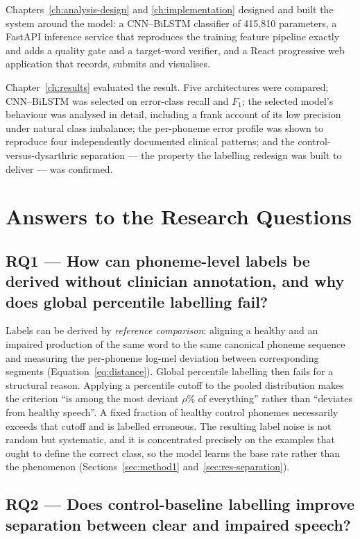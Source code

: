 Chapters~\ref{ch:analysis-design} and \ref{ch:implementation} designed and built
the system around the model: a CNN--BiLSTM classifier of 415{,}810 parameters, a
FastAPI inference service that reproduces the training feature pipeline exactly
and adds a quality gate and a target-word verifier, and a React progressive web
application that records, submits and visualises.

Chapter~\ref{ch:results} evaluated the result. Five architectures were compared;
CNN--BiLSTM was selected on error-class recall and $F_1$; the selected model's
behaviour was analysed in detail, including a frank account of its low precision
under natural class imbalance; the per-phoneme error profile was shown to
reproduce four independently documented clinical patterns; and the
control-versus-dysarthric separation --- the property the labelling redesign was
built to deliver --- was confirmed.

\section{Answers to the Research Questions}
\label{sec:conc-rq}

\subsection*{RQ1 --- How can phoneme-level labels be derived without clinician
annotation, and why does global percentile labelling fail?}

Labels can be derived by \emph{reference comparison}: aligning a healthy and an
impaired production of the same word to the same canonical phoneme sequence and
measuring the per-phoneme log-mel deviation between corresponding segments
(Equation~\eqref{eq:distance}). Global percentile labelling then fails for a
structural reason. Applying a percentile cutoff to the pooled distribution makes
the criterion ``is among the most deviant $\rho\%$ of everything'' rather than
``deviates from healthy speech''. A fixed fraction of healthy control phonemes
necessarily exceeds that cutoff and is labelled erroneous. The resulting label
noise is not random but systematic, and it is concentrated precisely on the
examples that ought to define the correct class, so the model learns the base
rate rather than the phenomenon
(Sections~\ref{sec:method1} and~\ref{sec:res-separation}).

\subsection*{RQ2 --- Does control-baseline labelling improve separation between
clear and impaired speech?}

